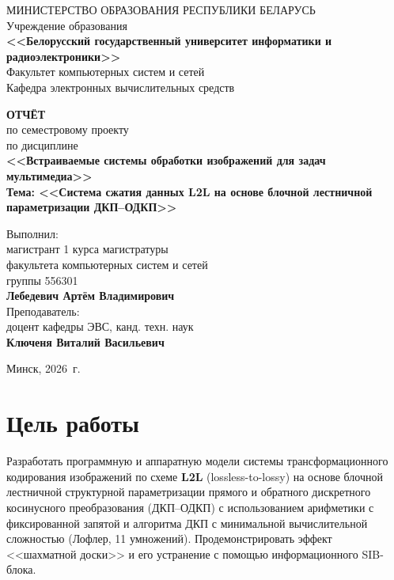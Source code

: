 \documentclass[12pt,a4paper]{article}
\begin{document}
\thispagestyle{empty}
\begin{center}
МИНИСТЕРСТВО ОБРАЗОВАНИЯ РЕСПУБЛИКИ БЕЛАРУСЬ\\[0.5em]
Учреждение образования\\[0.5em]
\textbf{<<Белорусский государственный университет информатики и радиоэлектроники>>}\\[2em]
Факультет компьютерных систем и сетей\\[0.5em]
Кафедра электронных вычислительных средств
\end{center}

\vspace{2em}
\begin{center}
\textbf{ОТЧЁТ}\\[0.5em]
по семестровому проекту\\[0.5em]
по дисциплине\\[0.5em]
\textbf{<<Встраиваемые системы обработки изображений для задач мультимедиа>>}\\[1em]
\textbf{Тема: <<Система сжатия данных L2L на основе блочной лестничной параметризации ДКП--ОДКП>>}
\end{center}

\vspace{3em}
\hfill\begin{minipage}{0.55\textwidth}
Выполнил:\\
магистрант 1 курса магистратуры\\
факультета компьютерных систем и сетей\\
группы 556301\\[0.3em]
\textbf{Лебедевич Артём Владимирович}\\[1.2em]
Преподаватель:\\
доцент кафедры ЭВС, канд. техн. наук\\
\textbf{Ключеня Виталий Васильевич}
\end{minipage}

\vfill
\begin{center}
Минск, 2026~г.
\end{center}
\newpage

\tableofcontents
\newpage

\section{Цель работы}

Разработать программную и аппаратную модели системы трансформационного кодирования изображений по схеме \textbf{L2L} (lossless-to-lossy) на основе блочной лестничной структурной параметризации прямого и обратного дискретного косинусного преобразования (ДКП--ОДКП) с использованием арифметики с фиксированной запятой и алгоритма ДКП с минимальной вычислительной сложностью (Лофлер, 11 умножений). Продемонстрировать эффект <<шахматной доски>> и его устранение с помощью информационного SIB-блока.
\end{document}
